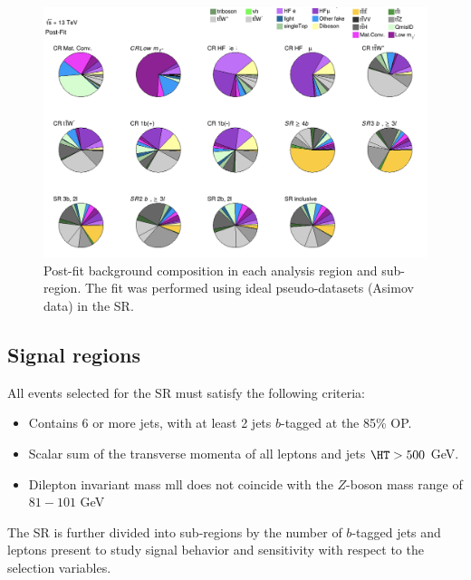 \documentclass[../thesis.tex]{subfiles}
\begin{document}
\begin{figure}[!htb]
\centering
\includegraphics[width=\linewidth]{fig/SRunblinded/mZp2000_PieChart_postFit.png}
\caption{\label{fig:ana:bg_comp}Post-fit background composition in each analysis region and sub-region. The fit was performed using ideal pseudo-datasets (Asimov data) in the \acs{SR}.}
\end{figure}


\subsection{Signal regions}
All events selected for the \acs{SR} must satisfy the following criteria:
\begin{itemize}
\item Contains 6 or more jets, with at least 2 jets $b$-tagged at the 85\% \acs{OP}.
\item Scalar sum of the transverse momenta of all leptons and jets $\HT > 500$ GeV.
\item Dilepton invariant mass \acs{mll} does not coincide with the $Z$-boson mass range of $81-101$ GeV
\end{itemize}

The \acs{SR} is further divided into sub-regions by the number of $b$-tagged jets and leptons  present to study signal behavior and sensitivity with respect to the selection variables.
\end{document}
